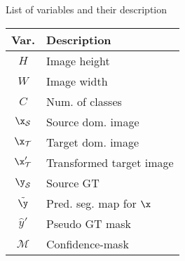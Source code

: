 \begin{margintable}[]\small
\caption{List of variables and their description}
\label{tab:tist_var_list}
\begin{tabular}{@{}cl@{}}
\toprule
{Var.}       & {Description}                                                                                         \\ \midrule
$H$            & Image height        \\
$W$            & Image width         \\
$C$            & Num. of classes     \\
$\x_\mathcal{S}$ & Source dom. image      \\
$\x_\mathcal{T}$ & Target dom. image      \\
$\x'_\mathcal{T}$ & Transformed target image     \\
$\y_\mathcal{S}$ & Source GT      \\
$\tilde{\y}$ & Pred. seg. map for $\x$   \\
$\hat{y}'$ & Pseudo GT mask \\
$\mathcal{M}$        & Confidence-mask     \\ \bottomrule
\end{tabular}
\end{margintable}